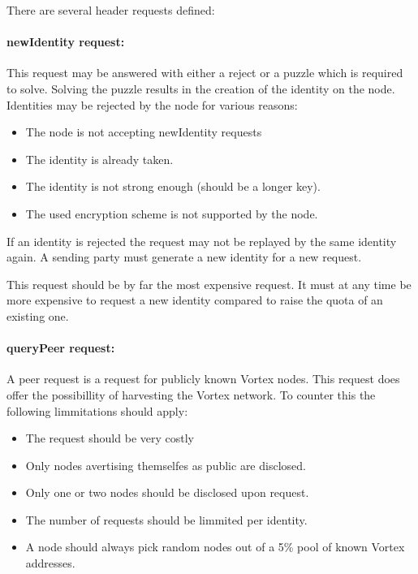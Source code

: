 There are several header requests defined:

\paragraph{newIdentity request:} This request may be answered with either a reject or a puzzle which is required to solve. Solving the puzzle results in the creation of the identity on the node. Identities may be rejected by the node for various reasons:

\begin{itemize}
	\item The node is not accepting newIdentity requests
	\item The identity is already taken.
	\item The identity is not strong enough (should be a longer key).
	\item The used encryption scheme is not supported by the node.
\end{itemize}

If an identity is rejected the request may not be replayed by the same identity again. A sending party must generate a new identity for a new request. 

This request should be by far the most expensive request. It must at any time be more expensive to request a new identity compared to raise the quota of an existing one.


\paragraph{queryPeer request:} A peer request is a request for publicly known Vortex nodes. This request does offer the possibillity of harvesting the Vortex network. To counter this the following limmitations should apply:
\begin{itemize}
	\item The request should be very costly
	\item Only nodes avertising themselfes as public are disclosed.
	\item Only one or two nodes should be disclosed upon request.
	\item The number of requests should be limmited per identity.
	\item A node should always pick random nodes out of a 5\% pool of known Vortex addresses.
\end{itemize}

